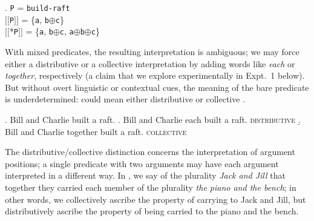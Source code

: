 \documentclass[linguex]{sp}
\newcommand{\sem}[1]{\mbox{$[\![$#1$]\!]$}}
\renewcommand{\tt}{\texttt}
\newcommand{\op}{$\oplus$}
\begin{document}
\ex. \tt{P} = \tt{build-raft}\\
\sem{\tt{P}} = \{\tt{a}, \tt{b}\op\tt{c}\}\\
\sem{*\tt{P}} = \{\tt{a}, \tt{b}\op\tt{c}, \tt{a}\op\tt{b}\op\tt{c}\}

With mixed predicates, the resulting interpretation is ambiguous; we may force either a distributive or a collective interpretation by adding words like \emph{each} or \emph{together}, respectively (a claim that we explore experimentally in Expt.~1 below). But without overt linguistic or contextual cues, the meaning of the bare predicate is underdetermined: \Next could mean either distributive \Next[a] or collective \Next[b].


\ex. Bill and Charlie built a raft.
\a. Bill and Charlie each built a raft. \hfill \textsc{distributive}
\b. Bill and Charlie together built a raft. \hfill \textsc{collective}


%
%
%
%
%
%

The distributive/collective distinction concerns the interpretation of argument positions; a single predicate with two arguments may have each argument interpreted in a different way. In \Next, we say of the plurality \emph{Jack and Jill} that together they carried each member of the plurality \emph{the piano and the bench}; in other words, we collectively ascribe the property of carrying to Jack and Jill, but distributively ascribe the property of being carried to the piano and the bench.
\end{document}
